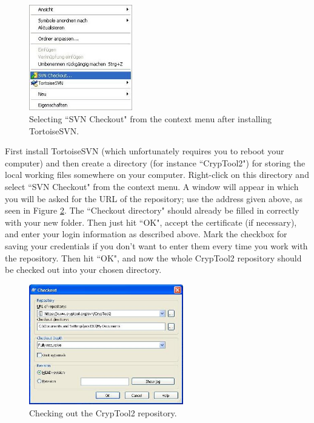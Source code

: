 \begin{figure}[h!]
	\centering
		\includegraphics[width=0.40\textwidth]{figures/tortoise_svn_checkout.jpg}
	\caption{Selecting ``SVN Checkout" from the context menu after installing TortoiseSVN.}
	\label{fig:tortoise_svn_checkout}
\end{figure}

First install TortoiseSVN (which unfortunately requires you to reboot your computer) and then create a directory (for instance ``CrypTool2") for storing the local working files somewhere on your computer. Right-click on this directory and select ``SVN Checkout" from the context menu. A window will appear in which you will be asked for the URL of the repository; use the address given above, as seen in Figure \ref{fig:tortoise_svn_checkout2}. The ``Checkout directory" should already be filled in correctly with your new folder. Then just hit ``OK", accept the certificate (if necessary), and enter your login information as described above. Mark the checkbox for saving your credentials if you don't want to enter them every time you work with the repository. Then hit ``OK", and now the whole CrypTool2 repository should be checked out into your chosen directory.
\clearpage

\begin{figure}[h!]
	\centering
		\includegraphics[width=0.60\textwidth]{figures/tortoise_svn_checkout2.jpg}
	\caption{Checking out the CrypTool2 repository.}
	\label{fig:tortoise_svn_checkout2}
\end{figure}

